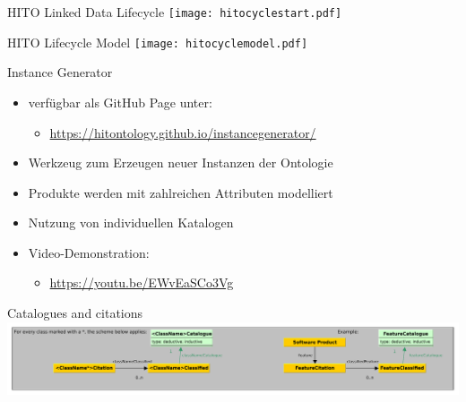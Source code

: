 \documentclass[aspectratio=1610,12pt]{beamer}
\begin{document}
\begin{frame}{HITO Linked Data Lifecycle}
  \centering
  \vspace{-0.5cm}
  \texttt{[image: hitocyclestart.pdf]}
\end{frame}

\begin{frame}{HITO Lifecycle Model}
  \centering
  \vspace{-0.5cm}
  \texttt{[image: hitocyclemodel.pdf]}
\end{frame}

\begin{frame}{Instance Generator}
\begin{spacing}{1.25}
\begin{itemize}
\item verfügbar als GitHub Page unter:
\begin{itemize}
\item \url{https://hitontology.github.io/instancegenerator/}
\end{itemize}
\item Werkzeug zum Erzeugen neuer Instanzen der Ontologie
\item Produkte werden mit zahlreichen Attributen modelliert
\item Nutzung von individuellen Katalogen
\item Video-Demonstration:
\begin{itemize}
\item \url{https://youtu.be/EWvEaSCo3Vg}
\end{itemize}
\end{itemize}
\end{spacing}
\end{frame}


\begin{frame}{Catalogues and citations}
\pause
\centering
\includegraphics[width=\textwidth]{img/excerpt1.pdf}
\end{frame}
\end{document}
